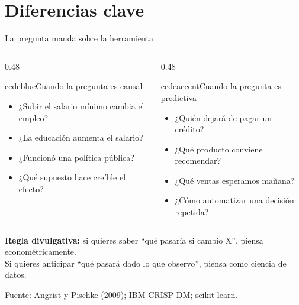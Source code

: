 \documentclass[aspectratio=169,11pt,table]{beamer}
\newcommand{\source}[1]{%
  \par\vspace{0.12cm}
  {\scriptsize\textcolor{ccdemid}{Fuente: #1}}%
}
\begin{document}
\section{Diferencias clave}

\begin{frame}{La pregunta manda sobre la herramienta}
\begin{columns}[T,onlytextwidth]
\begin{column}{0.48\textwidth}
\begin{contrastbox}{ccdeblue}{Cuando la pregunta es causal}
\small
\begin{itemize}
  \item ¿Subir el salario mínimo cambia el empleo?
  \item ¿La educación aumenta el salario?
  \item ¿Funcionó una política pública?
  \item ¿Qué supuesto hace creíble el efecto?
\end{itemize}
\end{contrastbox}
\end{column}
\begin{column}{0.48\textwidth}
\begin{contrastbox}{ccdeaccent}{Cuando la pregunta es predictiva}
\small
\begin{itemize}
  \item ¿Quién dejará de pagar un crédito?
  \item ¿Qué producto conviene recomendar?
  \item ¿Qué ventas esperamos mañana?
  \item ¿Cómo automatizar una decisión repetida?
\end{itemize}
\end{contrastbox}
\end{column}
\end{columns}

\vspace{0.35cm}
\begin{keybox}
\centering
\textbf{Regla divulgativa:} si quieres saber ``qué pasaría si cambio X'', piensa econométricamente.\\
Si quieres anticipar ``qué pasará dado lo que observo'', piensa como ciencia de datos.
\end{keybox}

\source{Angrist y Pischke (2009); IBM CRISP-DM; scikit-learn.}
\end{frame}
\end{document}
